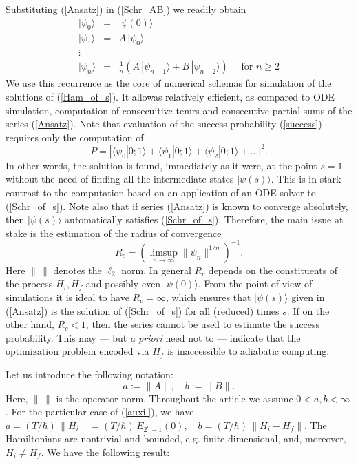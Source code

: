 \documentclass[11 pt]{article}
\begin{document}
Substituting (\ref{Ansatz}) in (\ref{Schr_AB}) we readily obtain
\begin{equation}\label{recurrence}
\begin{array}{lll}
|\psi_0\rangle &=& |\psi(0)\rangle \\
|\psi_1\rangle & =& A \,|\psi_0\rangle \\
\vdots & &\\
|\psi_n\rangle & = &\frac{1}{n} \left(A\, |\psi_{n-1}\rangle + B\, |\psi_{n-2}\rangle\right)\quad \mbox{ for } n\geq 2
\end{array}
\end{equation}
We use this recurrence as the core of numerical schemas for simulation of the solutions of (\ref{Ham_of_s}). It allowas relatively efficient, as compared to ODE simulation, computation of consecuitive temrs and consecutive partial sums of the series (\ref{Ansatz}). Note that evaluation of the success probability (\ref{success}) requires only the computation of
\[
P =  |\langle\psi_0 | 0;1\rangle +\langle \psi_1| 0;1\rangle +\langle \psi_2 | 0;1\rangle+\ldots |^2.
\]
In other words, the solution is found, immediately as it were, at the point $s=1$ without the need of finding all the intermediate states $|\psi(s)\rangle$. This is in stark contrast to the computation based on an application of an ODE solver to (\ref{Schr_of_s}).
 Note also that if series (\ref{Ansatz}) is known to converge absolutely, then $|\psi(s)\rangle$ automatically satisfies (\ref{Schr_of_s}). Therefore, the main issue at stake is the estimation of the radius of convergence
\begin{equation}\label{def_Rc}
R_{c} = \left(\limsup\limits_{n \rightarrow \infty} \|\psi_n\|^{1/n}\right)^{-1}.
\end{equation}
Here $\|\,\|$ denotes the $\ell_2$ norm. In general $R_c$ depends on the constituents of the process $H_i, H_f$ and possibly even $|\psi(0)\rangle$. From the point of view of simulations it is ideal to have $R_c = \infty$, which ensures that $|\psi(s)\rangle$ given in (\ref{Ansatz}) is the solution of (\ref{Schr_of_s}) for all (reduced) times $s$. If on the other hand, $R_c <1$, then the series  cannot be used to estimate the success probability. This may --- but \textit{a priori} need not to --- indicate that the optimization problem encoded via $H_f$ is inaccessible to adiabatic computing.

Let us introduce the following notation:
\begin{equation}
a := \|A\| , \quad b := \|B\| .
\end{equation}
Here, $\|\,\|$ is the operator norm.
Throughout the article we assume $0< a,b < \infty$. For the particular case of (\ref{auxil}), we have $a  = (T/\hbar)\,\|H_i\| = (T/\hbar)\,E_{2^n-1}(0), \quad b =  (T/\hbar)\,\|H_i-H_f\|$. The Hamiltonians are nontrivial and bounded, e.g. finite dimensional, and, moreover, $H_i\neq H_f$. We have the following result:
\end{document}
